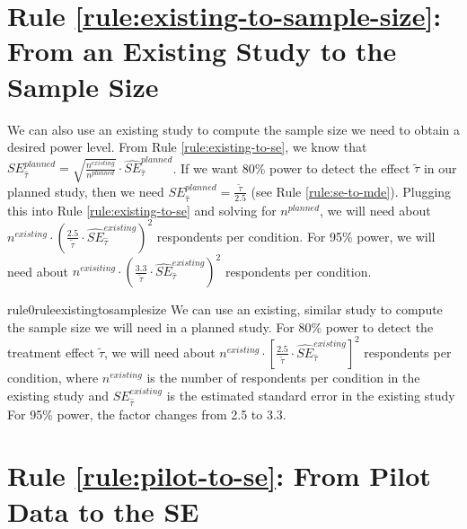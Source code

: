 \documentclass[12pt]{article}
\begin{document}
\section*{Rule \ref{rule:existing-to-sample-size}: From an Existing Study to the Sample Size}

We can also use an existing study to compute the sample size we need to obtain a desired power level.
From Rule \ref{rule:existing-to-se}, we know that $SE_{\widehat{\tau}}^{planned} = \sqrt{\frac{n^{existing}}{n^{planned}}} \cdot {\widehat{SE}}_{\widehat{\tau}}^{planned}$.
If we want 80\% power to detect the effect $\widetilde{\tau}$ in our planned study, then we need $SE_{\widehat{\tau}}^{planned} = \frac{\widetilde{\tau}}{2.5}$ (see
Rule \ref{rule:se-to-mde}). Plugging this into Rule \ref{rule:existing-to-se} and solving for $n^{planned}$, we will need about $n^{existing} \cdot \left( \frac{2.5}{\widetilde{\tau}} \cdot {\widehat{SE}}_{\widehat{\tau}}^{existing} \right)^{2}$ respondents per condition. 
For 95\% power, we will need about $n^{exisiting} \cdot \left( \frac{3.3}{\widetilde{\tau}} \cdot {\widehat{SE}}_{\widehat{\tau}}^{existing} \right)^{2}$ respondents per condition.

\begin{restatable}{rule0}{ruleexistingtosamplesize}
\label{rule:existing-to-sample-size}
We can use an existing, similar study to compute the sample size we will need in a planned study. For 80\% power to detect the treatment effect $\widetilde{\tau}$, we will need about $n^{existing} \cdot \left\lbrack \frac{2.5}{\widetilde{\tau}} \cdot {\widehat{SE}}_{\widehat{\tau}}^{existing} \right\rbrack^{2}$ respondents per condition, where $n^{existing}$ is the number of respondents per condition in the existing study and $SE_{\widehat{\tau}}^{existing}$ is the estimated standard error in the existing study
For 95\% power, the factor changes from 2.5 to 3.3.
\end{restatable}

\section*{Rule \ref{rule:pilot-to-se}: From Pilot Data to the SE}
\end{document}

